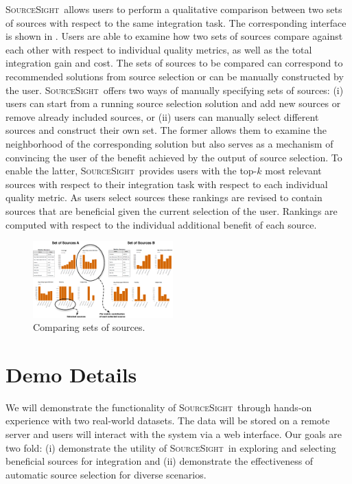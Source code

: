 \documentclass{vldb}
\newcommand\system{\textsc{SourceSight}}
\begin{document}
\system~allows users to perform a qualitative comparison between two sets of sources with respect to the same integration task. The corresponding interface is shown in . Users are able to examine how two sets of sources compare against each other with respect to individual quality metrics, as well as the total integration gain and cost. The sets of sources to be compared can correspond to recommended solutions from source selection or can be manually constructed by the user. \system~offers two ways of manually specifying sets of sources: (i) users can start from a running source selection solution and add new sources or remove already included sources, or (ii) users can manually select different sources and construct their own set. The former allows them to examine the neighborhood of the corresponding solution but also serves as a mechanism of convincing the user of the benefit achieved by the output of source selection. To enable the latter, \system~provides users with the top-$k$ most relevant sources with respect to their integration task with respect to each individual quality metric. As users select sources these rankings are revised to contain sources that are beneficial given the current selection of the user. Rankings are computed with respect to the individual additional benefit of each source. 
\begin{figure}
	\begin{center}
	\includegraphics[trim=0 0 0 0, clip,width=0.48\textwidth]{fig/compSS}
	\vspace{-20pt}
	\caption{Comparing sets of sources.}
	\label{fig:comparison}
	\vspace{-25pt}
	\end{center}
\end{figure}

\vspace{-5pt}
\section{Demo Details}
\label{sec:details}
We will demonstrate the functionality of \system~through hands-on experience with two real-world datasets. The data will be stored on a remote server and users will interact with the system via a web interface. Our goals are two fold: (i) demonstrate the utility of \system~in exploring and selecting beneficial sources for integration and (ii) demonstrate the effectiveness of automatic source selection for diverse scenarios. 
\end{document}
